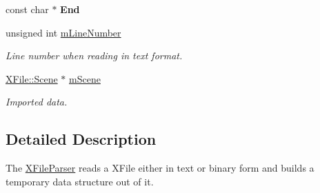 \begin{DoxyCompactItemize}
\item 
\hypertarget{class_assimp_1_1_x_file_parser_a853f28bab67231fa3dbc6e1edf673230}{const char $\ast$ {\bfseries End}}\label{class_assimp_1_1_x_file_parser_a853f28bab67231fa3dbc6e1edf673230}

\item 
\hypertarget{class_assimp_1_1_x_file_parser_a633201b2fb3ce8cc3bc1e8224288ab8b}{unsigned int \hyperlink{class_assimp_1_1_x_file_parser_a633201b2fb3ce8cc3bc1e8224288ab8b}{m\+Line\+Number}}\label{class_assimp_1_1_x_file_parser_a633201b2fb3ce8cc3bc1e8224288ab8b}

\begin{DoxyCompactList}\small\item\em Line number when reading in text format. \end{DoxyCompactList}\item 
\hypertarget{class_assimp_1_1_x_file_parser_ac45207bc58a2cd10226c909f7ee16570}{\hyperlink{struct_assimp_1_1_x_file_1_1_scene}{X\+File\+::\+Scene} $\ast$ \hyperlink{class_assimp_1_1_x_file_parser_ac45207bc58a2cd10226c909f7ee16570}{m\+Scene}}\label{class_assimp_1_1_x_file_parser_ac45207bc58a2cd10226c909f7ee16570}

\begin{DoxyCompactList}\small\item\em Imported data. \end{DoxyCompactList}\end{DoxyCompactItemize}


\subsection{Detailed Description}
The \hyperlink{class_assimp_1_1_x_file_parser}{X\+File\+Parser} reads a X\+File either in text or binary form and builds a temporary data structure out of it. 

